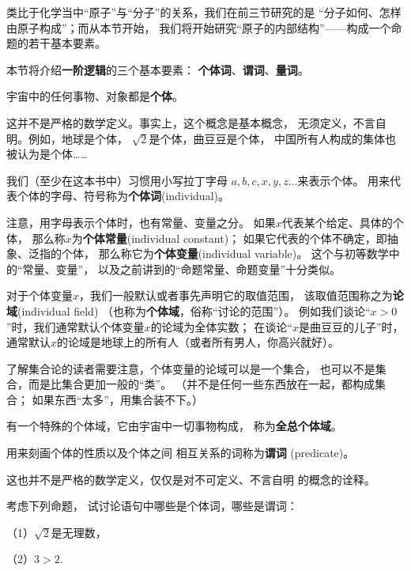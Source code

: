 类比于化学当中“原子”与“分子”的关系，我们在前三节研究的是
“分子如何、怎样由原子构成”；而从本节开始，
我们将开始研究“原子的内部结构”——构成一个命题的若干基本要素。\vs

本节将介绍\textbf{一阶逻辑}的三个基本要素：
\textbf{个体词}、\textbf{谓词}、\textbf{量词}。\vs

\begin{definition}[个体]
宇宙中的任何事物、对象都是\textbf{个体}。
\end{definition}

这并不是严格的数学定义。事实上，这个概念是基本概念，
无须定义，不言自明。例如，地球是个体，
$\sqrt{2}$是个体，曲豆豆是个体，
中国所有人构成的集体也被认为是个体……

我们（至少在这本书中）习惯用小写拉丁字母
$a,b,c,x,y,z...$来表示个体。
用来代表个体的字母、符号称为\textbf{个体词}(individual)。

注意，用字母表示个体时，也有常量、变量之分。
如果$x$代表某个给定、具体的个体，
那么称$x$为\textbf{个体常量}(individual constant)；
如果它代表的个体不确定，即抽象、泛指的个体，
那么称它为\textbf{个体变量}(individual variable)。
这个与初等数学中的“常量、变量”，
以及之前讲到的“命题常量、命题变量”十分类似。

对于个体变量$x$，我们一般默认或者事先声明它的取值范围，
该取值范围称之为\textbf{论域}(individual field)
（也称为\textbf{个体域}，俗称“讨论的范围”）。
例如我们谈论“$x>0$”时，我们通常默认个体变量$x$的论域为全体实数；
在谈论“$x$是曲豆豆的儿子”时，
通常默认$x$的论域是地球上的所有人（或者所有男人，你高兴就好）。

了解集合论的读者需要注意，个体变量的论域可以是一个集合，
也可以不是集合，而是比集合更加一般的“类”。
（并不是任何一些东西放在一起，都构成集合；
如果东西“太多”，用集合装不下。）

有一个特殊的个体域，它由宇宙中一切事物构成，
称为\textbf{全总个体域}。

\begin{definition}[谓词]用来刻画个体的性质以及个体之间
相互关系的词称为\textbf{谓词}
(predicate)。
\end{definition}

这也并不是严格的数学定义，仅仅是对不可定义、不言自明
的概念的诠释。

\begin{example}[谓词的简单例子]考虑下列命题，
试讨论语句中哪些是个体词，哪些是谓词：

（1）$\sqrt{2}$是无理数，

（2）$3>2$.
\end{example}

